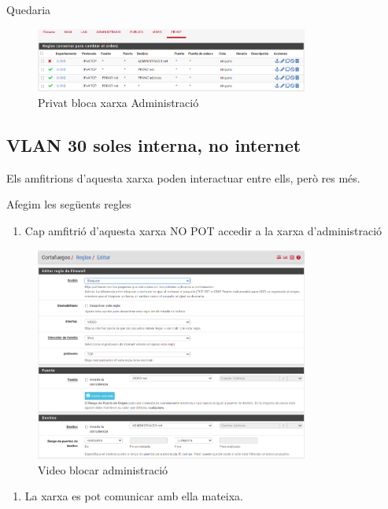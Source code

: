 \documentclass[
  10pt,
]{krantz}
\providecommand{\tightlist}{%
  \setlength{\itemsep}{0pt}\setlength{\parskip}{0pt}}
\begin{document}
Quedaria

\begin{figure}
\centering
\includegraphics[width=0.8\textwidth,height=\textheight]{imatges/proxmox/regla_privat5.png}
\caption{Privat bloca xarxa Administració}
\end{figure}

\hypertarget{vlan-30-soles-interna-no-internet}{%
\subsection{VLAN 30 soles interna, no internet}\label{vlan-30-soles-interna-no-internet}}

Els amfitrions d'aquesta xarxa poden interactuar entre ells, però res més.

Afegim les següents regles

\begin{enumerate}
\def\labelenumi{\arabic{enumi}.}
\tightlist
\item
  Cap amfitrió d'aquesta xarxa NO POT accedir a la xarxa d'administració
\end{enumerate}

\begin{figure}
\centering
\includegraphics[width=0.8\textwidth,height=\textheight]{imatges/proxmox/regla_video1.png}
\caption{Video blocar administració}
\end{figure}

\begin{enumerate}
\def\labelenumi{\arabic{enumi}.}
\setcounter{enumi}{1}
\tightlist
\item
  La xarxa es pot comunicar amb ella mateixa.
\end{enumerate}
\end{document}
